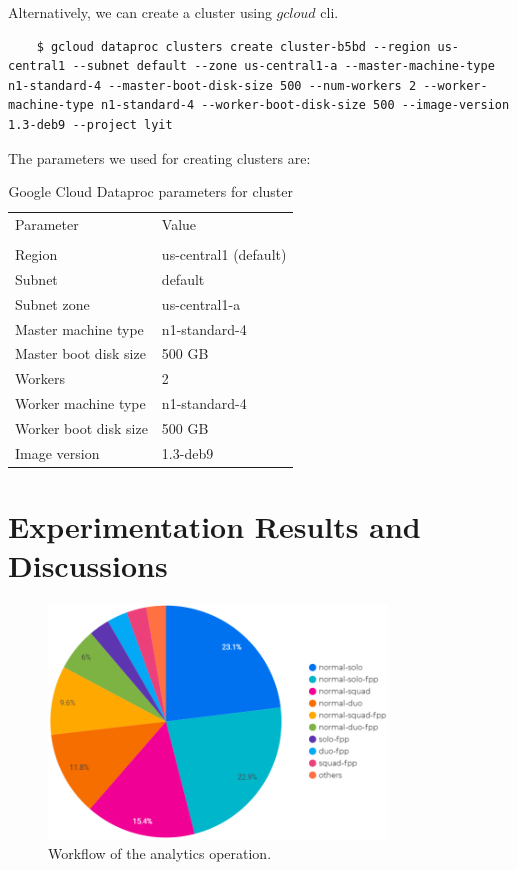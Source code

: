 \documentclass[journal,twoside,web]{ieeecolor}
\begin{document}
\newpage

Alternatively, we can create a cluster using $gcloud$ cli.

\begin{lstlisting}
    $ gcloud dataproc clusters create cluster-b5bd --region us-central1 --subnet default --zone us-central1-a --master-machine-type n1-standard-4 --master-boot-disk-size 500 --num-workers 2 --worker-machine-type n1-standard-4 --worker-boot-disk-size 500 --image-version 1.3-deb9 --project lyit
\end{lstlisting}

The parameters we used for creating clusters are:
\begin{table}[h]
    \caption{Google Cloud Dataproc parameters for cluster}
    \label{tab:parameters}
	\centering
    \begin{tabular}{l l}
    \toprule
    \multirow{1}{*}{Parameter} & \multirow{1}{*}{Value} \\ 
    & \\ \midrule
    Region & us-central1 (default) \\ \midrule
    Subnet & default \\ \midrule
    Subnet zone & us-central1-a \\ \midrule
    Master machine type & n1-standard-4 \\ \midrule
    Master boot disk size & 500 GB \\ \midrule
    Workers & 2 \\ \midrule
    Worker machine type & n1-standard-4 \\ \midrule
    Worker boot disk size & 500 GB \\ \midrule
    Image version & 1.3-deb9 \\
    \bottomrule
    \end{tabular}
\end{table}

\section{Experimentation Results and Discussions}
\label{sec:discussion}

\begin{figure}[h]
    \includegraphics[width=9cm]{images/match_type_vs_kills.png}
    \caption{Workflow of the analytics operation.}
    \label{fig:3}
\end{figure}
\end{document}
